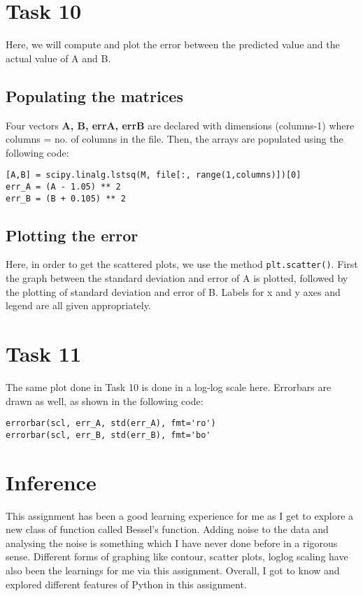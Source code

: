 \documentclass[11pt, a4paper]{article}
\begin{document}
\section{Task 10}
Here, we will compute and plot the error between the predicted value and the actual value of A and B.
\subsection{Populating the matrices}
Four vectors \textbf{A, B, errA, errB} are declared with dimensions (columns-1) where columns = no. of columns in the file. Then, the arrays are populated using the following code:
\begin{verbatim}
[A,B] = scipy.linalg.lstsq(M, file[:, range(1,columns)])[0]  
err_A = (A - 1.05) ** 2       
err_B = (B + 0.105) ** 2
\end{verbatim} 
\subsection{Plotting the error}
Here, in order to get the scattered plots, we use the method \texttt{plt.scatter()}. First the graph between the standard deviation and error of A is plotted, followed by the plotting of standard deviation and error of B. Labels for x and y axes and legend are all given appropriately.

\section{Task 11}
The same plot done in Task 10 is done in a log-log scale here. Errorbars are drawn as well, as shown in the following code:
\begin{verbatim}
errorbar(scl, err_A, std(err_A), fmt='ro')
errorbar(scl, err_B, std(err_B), fmt='bo'
\end{verbatim}

\section{Inference}
This assignment has been a good learning experience for me as I get to explore a new class of function called Bessel's function.  Adding noise to the data and analysing the noise is something which I have never done before in a rigorous sense. Different forms of graphing like contour, scatter plots, loglog scaling have also been the learnings for me via this assignment. Overall, I got to know and explored different features of Python in this assignment. 
\end{document}

